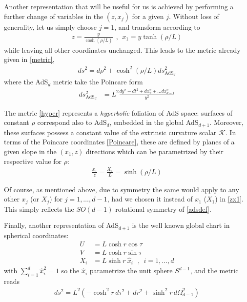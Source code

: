 Another representation that will be useful for us is achieved by performing a further change of variables in the $(z,x_j)$ for a given $j$. Without loss of generality, let us simply choose $j=1$, and transform according to
\begin{align}\label{zx1}
z=\frac{y}{\cosh \left( \rho/L \right)}\ \ ,\ \ x_1=y\tanh\left( \rho/L \right)
\end{align}
while leaving all other coordinates unchanged. This leads to the metric already given in \eqref{metric},
\begin{align}\label{hyper}
ds^2=d\rho^2+\cosh^2\left( \rho/L \right) ds^2_{\text{AdS}_{d}}
\end{align}
where the AdS$_d$ metric take the Poincare form
\begin{align}\label{}
ds^2_{\text{AdS}_{d}}&=L^2 \frac{dy^2-dt^2+dx_2^2+\hdots dx_{d-1}^2}{y^2}
\end{align}

The metric \eqref{hyper} represents a \textit{hyperbolic} foliation of AdS space: surfaces of constant $\rho$ correspond also to AdS$_{d}$, embedded in the global AdS$_{d+1}$. Moreover, these surfaces possess a constant value of the extrinsic curvature scalar $\mathcal{K}$. In terms of the Poincare coordinates \eqref{Poincare}, these are defined by planes of a given slope in the $(x_1,z)$ directions which can be parametrized by their respective value for $\rho$:
\begin{align}\label{}
\frac{x_1}{z}=\frac{X_1}{L}=\sinh \left( \rho/L \right)
\end{align}

Of course, as mentioned above, due to symmetry the same would apply to any other $x_{j}$ (or $X_j$) for $j=1,\hdots,d-1$, had we chosen it instead of $x_1$ ($X_1$) in \eqref{zx1}. This simply reflects the $SO(d-1)$ rotational symmetry of \eqref{adsdef}.

Finally, another representation of AdS$_{d+1}$ is the well known global chart in spherical coordinates:
\begin{align}\label{}
U&=L\cosh r \cos \tau\\
V&=L\cosh r \sin \tau\\
X_i&=L\sinh r\ \hat{x}_i\ \ \ ,\ \ i=1,\hdots,d
\end{align}
with $\sum_{i=1}^{d}\hat{x}_i^2=1$ so the $\hat{x}_i$ parametrize the unit sphere $S^{d-1}$, and the metric reads
\begin{align}\label{globalads}
ds^2=L^2\left( -\cosh^2r\, d\tau^2+dr^2+\sinh^2 r\, d\Omega_{d-1}^2 \right)
\end{align}

